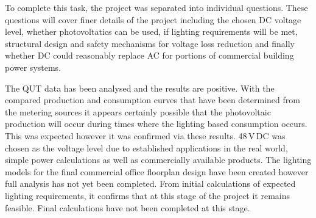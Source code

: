 To complete this task, the project was separated into individual questions. These questions will cover finer details of the project including the chosen DC voltage level, whether photovoltatics can be used, if lighting requirements will be met, structural design and safety mechanisms for voltage loss reduction and finally whether DC could reasonably replace AC for portions of commercial building power systems. 
\newline

The QUT data has been analysed and the results are positive. With the compared production and consumption curves that have been determined from the metering sources it appears certainly possible that the photovoltaic production will occur during times where the lighting based consumption occurs. This was expected however it was confirmed via these results. 48\,V\,DC was chosen as the voltage level due to established applications in the real world, simple power calculations as well as commercially available products. The lighting models for the final commercial office floorplan design have been created however full analysis has not yet been completed. From initial calculations of expected lighting requirements, it confirms that at this stage of the project it remains feasible. Final calculations have not been completed at this stage.    
 
\newpage
